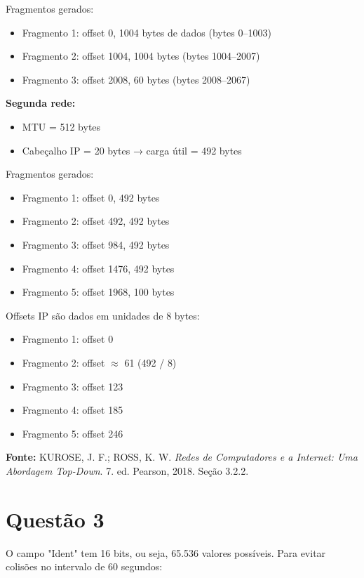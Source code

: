 \documentclass[12pt]{article}
\begin{document}
Fragmentos gerados:
\begin{itemize}
    \item Fragmento 1: offset 0, 1004 bytes de dados (bytes 0–1003)
    \item Fragmento 2: offset 1004, 1004 bytes (bytes 1004–2007)
    \item Fragmento 3: offset 2008, 60 bytes (bytes 2008–2067)
\end{itemize}

\vspace{0.5em}
\textbf{Segunda rede:}
\begin{itemize}
    \item MTU = 512 bytes
    \item Cabeçalho IP = 20 bytes → carga útil = 492 bytes
\end{itemize}

Fragmentos gerados:
\begin{itemize}
    \item Fragmento 1: offset 0, 492 bytes
    \item Fragmento 2: offset 492, 492 bytes
    \item Fragmento 3: offset 984, 492 bytes
    \item Fragmento 4: offset 1476, 492 bytes
    \item Fragmento 5: offset 1968, 100 bytes
\end{itemize}

Offsets IP são dados em unidades de 8 bytes:

\begin{itemize}
    \item Fragmento 1: offset 0  
    \item Fragmento 2: offset $\approx$ 61 (492 / 8)  
    \item Fragmento 3: offset 123  
    \item Fragmento 4: offset 185  
    \item Fragmento 5: offset 246
\end{itemize}

\textbf{Fonte:} KUROSE, J. F.; ROSS, K. W. \textit{Redes de Computadores e a Internet: Uma Abordagem Top-Down}. 7. ed. Pearson, 2018. Seção 3.2.2.

\section*{Questão 3}

O campo "Ident" tem 16 bits, ou seja, 65.536 valores possíveis. Para evitar colisões no intervalo de 60 segundos:
\end{document}
